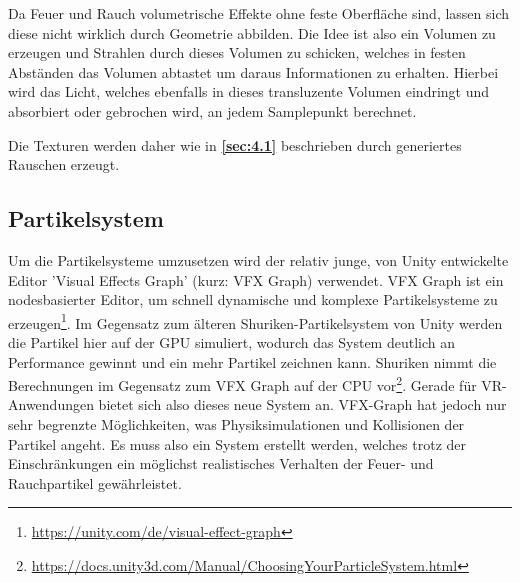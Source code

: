 Da Feuer und Rauch volumetrische Effekte ohne feste Oberfläche sind, lassen sich diese nicht wirklich durch Geometrie abbilden. Die Idee ist also ein
Volumen zu erzeugen und Strahlen durch dieses Volumen zu schicken, welches in festen Abständen das Volumen abtastet um daraus Informationen zu erhalten.
Hierbei wird das Licht, welches ebenfalls in dieses transluzente Volumen eindringt und absorbiert oder gebrochen wird, an jedem Samplepunkt berechnet.

Die Texturen werden daher wie in \textbf{\autoref{sec:4.1}} beschrieben durch generiertes Rauschen erzeugt.



\subsection{Partikelsystem}
Um die Partikelsysteme umzusetzen wird der relativ junge, von Unity entwickelte Editor 'Visual Effects Graph'
(kurz: VFX Graph) verwendet. VFX Graph ist ein nodesbasierter Editor, um schnell
dynamische und komplexe Partikelsysteme zu erzeugen\footnote{\url{https://unity.com/de/visual-effect-graph}}.
Im Gegensatz zum älteren Shuriken-Partikelsystem von Unity werden die Partikel hier auf der GPU
simuliert, wodurch das System deutlich an Performance gewinnt und ein mehr Partikel zeichnen kann.
Shuriken nimmt die Berechnungen im Gegensatz zum VFX Graph auf der CPU vor\footnote{\url{https://docs.unity3d.com/Manual/ChoosingYourParticleSystem.html}}.
Gerade für VR-Anwendungen bietet sich also dieses neue System an.
VFX-Graph hat jedoch nur sehr begrenzte Möglichkeiten, was Physiksimulationen und Kollisionen der Partikel angeht.
Es muss also ein System erstellt werden, welches trotz der Einschränkungen ein möglichst realistisches
Verhalten der Feuer- und Rauchpartikel gewährleistet.




\newpage
